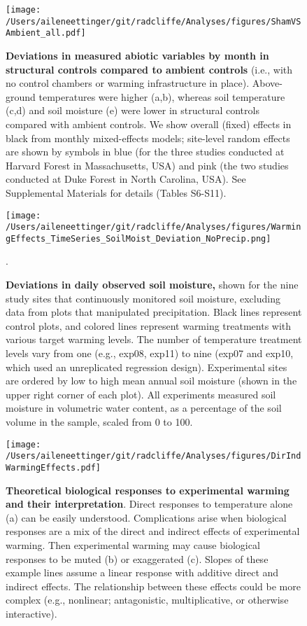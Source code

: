 \documentclass{article}
\begin{document}
 \begin{figure}[p]
\centering
\texttt{[image: /Users/aileneettinger/git/radcliffe/Analyses/figures/ShamVSAmbient\_all.pdf]}  
 \caption{\textbf{Deviations in measured abiotic variables by month in structural controls compared to ambient controls} (i.e., with no control chambers or warming infrastructure in place). Above-ground temperatures were higher (a,b), whereas soil temperature (c,d) and soil moisture (e) were lower in structural controls compared with ambient controls. We show overall (fixed) effects in black from monthly mixed-effects models; site-level random effects are shown by symbols in blue (for the three studies conducted at Harvard Forest in Massachusetts, USA) and pink (the two studies conducted at Duke Forest in North Carolina, USA). See Supplemental Materials for details (Tables S6-S11). }
 \label{fig:shamamb}
 \end{figure}
\clearpage
 \begin{figure}[h]
    \centering
 \texttt{[image: /Users/aileneettinger/git/radcliffe/Analyses/figures/WarmingEffects\_TimeSeries\_SoilMoist\_Deviation\_NoPrecip.png]}  
 \caption{\textbf{Deviations in daily observed soil moisture,} shown for the nine study sites that continuously monitored soil moisture, excluding data from plots that manipulated precipitation. Black lines represent control plots, and colored lines represent warming treatments with various target warming levels. The number of temperature treatment levels vary from one (e.g., exp08, exp11) to nine (exp07 and exp10, which used an unreplicated regression design).  Experimental sites are ordered by low to high mean annual soil moisture (shown in the upper right corner of each plot). All experiments measured soil moisture in volumetric water content, as a percentage of the soil volume in the sample, scaled from 0 to 100.}. 
 \label{fig:mois}
 \end{figure}
 
 \begin{figure}[h]
\centering
 \texttt{[image: /Users/aileneettinger/git/radcliffe/Analyses/figures/DirIndWarmingEffects.pdf]} 
 \caption{\textbf{Theoretical biological responses to experimental warming and their interpretation}. Direct responses to temperature alone (a) can be easily understood. Complications arise when biological responses are a mix of the direct and indirect effects of experimental warming. Then experimental warming may cause biological responses to be muted (b) or exaggerated (c). Slopes of these example lines assume a linear response with additive direct and indirect effects. The relationship between these effects could be more complex (e.g., nonlinear; antagonistic, multiplicative, or otherwise interactive).} 
\label{fig:biolimp}
\end{figure}
\end{document}
